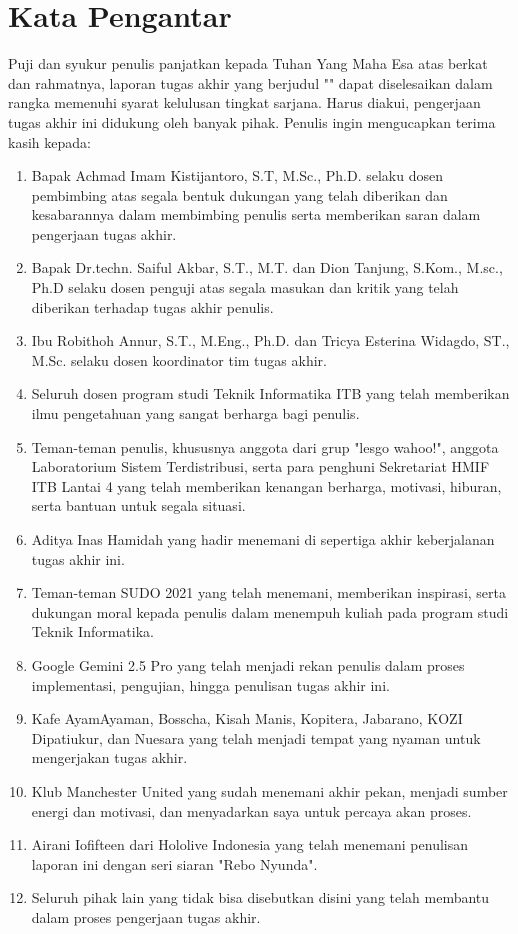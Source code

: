 \chapter*{Kata Pengantar}

Puji dan syukur penulis panjatkan kepada Tuhan Yang Maha Esa atas berkat dan rahmatnya, laporan tugas akhir yang berjudul "\thetitle" dapat diselesaikan dalam rangka memenuhi syarat kelulusan tingkat sarjana. Harus diakui, pengerjaan tugas akhir ini didukung oleh banyak pihak. Penulis ingin mengucapkan terima kasih kepada:

\begin{enumerate}
  \item Bapak Achmad Imam Kistijantoro, S.T, M.Sc., Ph.D. selaku dosen pembimbing atas segala bentuk dukungan yang telah diberikan dan kesabarannya dalam membimbing penulis serta memberikan saran dalam pengerjaan tugas akhir.
  \item Bapak Dr.techn. Saiful Akbar, S.T., M.T. dan Dion Tanjung, S.Kom., M.sc., Ph.D selaku dosen penguji atas segala masukan dan kritik yang telah diberikan terhadap tugas akhir penulis.
  \item Ibu Robithoh Annur, S.T., M.Eng., Ph.D. dan Tricya Esterina Widagdo, ST., M.Sc. selaku dosen koordinator tim tugas akhir.
  \item Seluruh dosen program studi Teknik Informatika ITB yang telah memberikan ilmu pengetahuan yang sangat berharga bagi penulis.
  \item Teman-teman penulis, khususnya anggota dari grup "lesgo wahoo!", anggota Laboratorium Sistem Terdistribusi, serta para penghuni Sekretariat HMIF ITB Lantai 4 yang telah memberikan kenangan berharga, motivasi, hiburan, serta bantuan untuk segala situasi.
  \item Aditya Inas Hamidah yang hadir menemani di sepertiga akhir keberjalanan tugas akhir ini.
  \item Teman-teman SUDO 2021 yang telah menemani, memberikan inspirasi, serta dukungan moral kepada penulis dalam menempuh kuliah pada program studi Teknik Informatika.
  \item Google Gemini 2.5 Pro yang telah menjadi rekan penulis dalam proses implementasi, pengujian, hingga penulisan tugas akhir ini.
  \item Kafe AyamAyaman, Bosscha, Kisah Manis, Kopitera, Jabarano, KOZI Dipatiukur, dan Nuesara yang telah menjadi tempat yang nyaman untuk mengerjakan tugas akhir.
  \item Klub Manchester United yang sudah menemani akhir pekan, menjadi sumber energi dan motivasi, dan menyadarkan saya untuk percaya akan proses.
  \item Airani Iofifteen dari Hololive Indonesia yang telah menemani penulisan laporan ini dengan seri siaran "Rebo Nyunda".
  \item Seluruh pihak lain yang tidak bisa disebutkan disini yang telah membantu dalam proses pengerjaan tugas akhir.
\end{enumerate}

